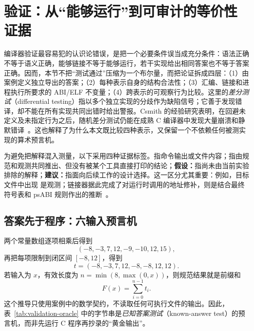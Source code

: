 \section{验证：从“能够运行”到可审计的等价性证据}
\label{sec:validation}

编译器验证最容易犯的认识论错误，是把一个必要条件误当成充分条件：语法正确不等于语义正确，能够链接不等于能够运行，若干实现给出相同答案也不等于答案正确。因而，本节不把“测试通过”压缩为一个布尔量，而把论证拆成四层：（1）由案例定义独立导出的答案；（2）每种表示自身的结构合法性；（3）汇编、链接和进程执行所要求的 ABI/ELF 不变量；（4）跨表示的可观察行为比较。这里的\emph{差分测试}（differential testing）指以多个独立实现的分歧作为缺陷信号；它善于发现错译，却不能在所有实现共同出错时给出警报。Csmith 的经验研究表明，在回避未定义及未指定行为之后，随机差分测试仍能在成熟 C 编译器中发现大量崩溃和静默错译~\cite{val-yang2011csmith}。这也解释了为什么本文既比较四种表示，又保留一个不依赖任何被测实现的算术预言机。

为避免把解释混入测量，以下采用四种证据标签。\observed 指命令输出或文件内容；\inferred 指由规范和观测共同推出、但没有被某个工具直接打印的结论；\textbf{假设：}指尚未由当前实验排除的解释；\textbf{建议：}指面向后续工作的设计选择。这一区分尤其重要：例如，目标文件中出现  是观测；链接器据此完成了对运行时调用的地址修补，则是结合最终符号表和 psABI 规则作出的推断~\cite{val-riscv-psabi}。

\subsection{答案先于程序：六输入预言机}

两个常量数组逐项相乘后得到
\[
 (-8,-3,7,12,-9,-10,12,15),
\]
再把每项限制到闭区间 $[-8,12]$，得到
\[
 t=(-8,-3,7,12,-8,-8,12,12).
\]
若输入为 $x$，有效长度为 $n=\min(8,\max(0,x))$，则规范结果就是前缀和
\begin{equation}
  F(x)=\sum_{i=0}^{n-1}t_i .
  \label{eq:validation-oracle}
\end{equation}
这个推导只使用案例中的数学契约，不读取任何可执行文件的输出。因此，表~\ref{tab:validation-oracle} 中的字节串是\emph{已知答案测试}（known-answer test）的预言机，而非先运行 C 程序再抄录的“黄金输出”。

